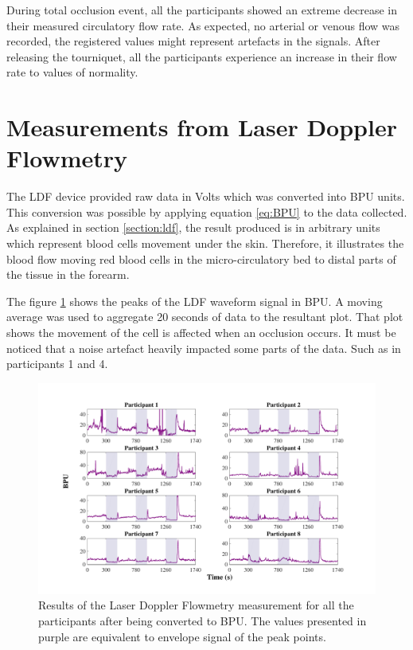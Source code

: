 During total occlusion event, all the participants showed an extreme decrease in their measured circulatory flow rate. As expected, no arterial or venous flow was recorded, the registered values might represent artefacts in the signals. After releasing the tourniquet, all the participants experience an increase in their flow rate to values of normality. 


\section{Measurements from Laser Doppler Flowmetry}
\label{section results 7}
The LDF device provided raw data in Volts which was converted into BPU units. This conversion was possible by applying equation \ref{eq:BPU} to the data collected.  As explained in section \ref{section:ldf}, the result produced is in arbitrary units which represent blood cells movement under the skin. Therefore, it illustrates the blood flow moving red blood cells in the micro-circulatory bed to distal parts of the tissue in the forearm.

The figure \ref{fig:LDF_flow} shows the peaks of the LDF waveform signal in BPU. A moving average was used to aggregate 20 seconds of data to the resultant plot. That plot shows the movement of the cell is affected when an occlusion occurs. It must be noticed that a noise artefact heavily impacted some parts of the data. Such as in participants 1 and 4.

\begin{figure}[!htb]
	\centering
	\includegraphics[width=\textwidth,height=\textheight,keepaspectratio,trim={2cm 0cm 2cm 0 cm},clip]{figure17}    
	\caption[Results of the LDF in BPU]{Results of the Laser Doppler Flowmetry measurement for all the participants after being converted to BPU. The values presented in purple are equivalent to envelope signal of the peak points.}
	\label{fig:LDF_flow}
\end{figure}

